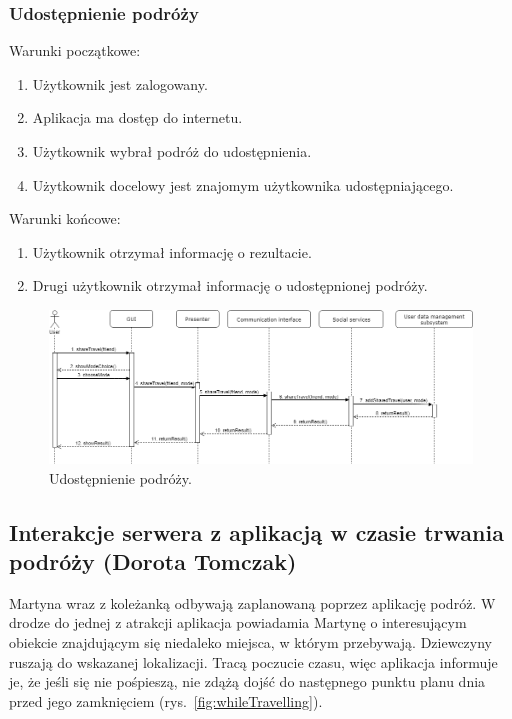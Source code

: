 \documentclass[10pt,twoside,a4paper]{report}
\begin{document}
\subsubsection{Udostępnienie podróży}

\noindent Warunki początkowe:
\begin{enumerate}
  \item Użytkownik jest zalogowany.
  \item Aplikacja ma dostęp do internetu.
  \item Użytkownik wybrał podróż do udostępnienia.
  \item Użytkownik docelowy jest znajomym użytkownika udostępniającego.
\end{enumerate}
\par
\noindent\newline
Warunki końcowe:
\begin{enumerate}
  \item Użytkownik otrzymał informację o rezultacie.
  \item Drugi użytkownik otrzymał informację o udostępnionej podróży.
\end{enumerate}

\noindent\newline
\begin{figure}[h]
\centering
\includegraphics[width=\linewidth]{shareTravel}
\caption{Udostępnienie podróży.}
\label{fig:shareTravel}
\end{figure}

\subsection{Interakcje serwera z aplikacją w czasie trwania podróży (Dorota Tomczak)}
\par Martyna wraz z koleżanką odbywają zaplanowaną poprzez aplikację podróż. W drodze do jednej z atrakcji aplikacja powiadamia Martynę o interesującym obiekcie znajdującym się niedaleko miejsca, w którym przebywają. Dziewczyny ruszają do wskazanej lokalizacji. Tracą poczucie czasu, więc aplikacja informuje je, że jeśli się nie pośpieszą, nie zdążą dojść do następnego punktu planu dnia przed jego zamknięciem (rys.~\ref{fig:whileTravelling}).
\end{document}
